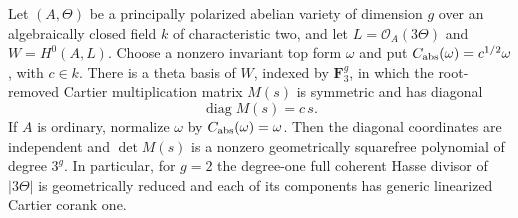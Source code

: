 \begin{theorem}\label{thm:ppav-level3-Cartier-symmetric}
Let $(A,\Theta)$ be a principally polarized abelian variety of dimension
$g$ over an algebraically closed field $k$ of characteristic two, and let
$L=\mathcal O_A(3\Theta)$ and $W=H^0(A,L)$.
Choose a nonzero invariant top form $\omega$ and put
$C_{\rm abs}(\omega)=c^{1/2}\omega$, with $c\in k$.
There is a theta basis of $W$, indexed by $\mathbf F_3^g$, in which
the root-removed Cartier multiplication matrix $M(s)$ is symmetric
and has diagonal
\[
                         \operatorname{diag}M(s)=c\,s.
\]
If $A$ is ordinary, normalize $\omega$ by $C_{\rm abs}(\omega)=\omega$.
Then the diagonal coordinates are independent and $\det M(s)$ is a
nonzero geometrically squarefree polynomial of degree $3^g$.
In particular, for $g=2$ the degree-one full coherent Hasse divisor of
$|3\Theta|$ is geometrically reduced and each of its components has
generic linearized Cartier corank one.
\end{theorem}

